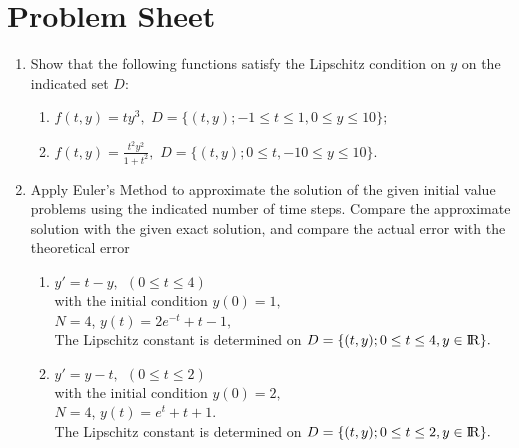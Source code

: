\section{Problem Sheet}
\begin{enumerate}
\item
Show that the following functions satisfy the Lipschitz condition on $y$ on the indicated set $D$:
\begin{enumerate}
\item
$f(t,y)=ty^3,$  $D=\{(t,y);-1\leq t \leq 1, 0\leq y \leq 10\};$
\item 
$f(t,y)=\frac{t^2y^2}{1+t^2},$  $D=\{(t,y);0\leq t, -10\leq y \leq 10 \}.$

\end{enumerate}
\item
Apply Euler's Method to approximate the solution of the given initial value problems using the indicated number of time steps. Compare the approximate solution with the given exact solution, and compare the actual error with the theoretical error
\begin{enumerate}
\item
$y'=t-y, \ \ (0\leq t \leq 4)$\\
with the initial condition $y(0)=1,$\\
$N=4$, 
$y(t)=2e^{-t}+t-1,$\\

The Lipschitz constant is determined on  $D=\{(t,y);0\leq t \leq 4, y\in \rm I\!R \}.$
\item 
$y'=y-t, \ \ (0\leq t \leq 2)$\\
with the initial condition $y(0)=2,$\\
$N=4$, 
$y(t)=e^{t}+t+1$.\\

The Lipschitz constant is determined on  $D=\{(t,y);0\leq t \leq 2, y\in \rm I\!R \}.$
\end{enumerate}

\end{enumerate}
\newpage